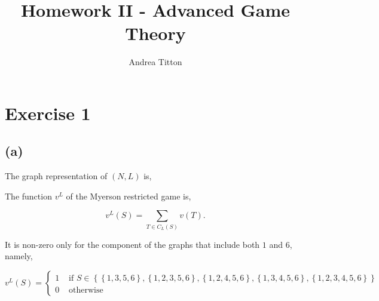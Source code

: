 \documentclass[american]{scrartcl}
\title{Homework II - Advanced Game Theory }
\author{Andrea Titton}
\newcommand{\set}[1]{\left\{#1\right\}}
\begin{document}

\maketitle

\section*{Exercise 1}

\subsection*{(a)}

The graph representation of $(N, L)$ is,

\vspace{1cm}
\begin{center}
\end{center}


The function $v^L$ of the Myerson restricted game is,

\begin{equation}
    v^L(S) = \sum_{T \in C_L(S)} v(T).
\end{equation}

It is non-zero only for the component of the graphs that include both $1$ and $6$, namely,

\begin{equation} \label{value_a}
    v^L(S) = \begin{cases}
        1 & \text{ if } S \in \set{\set{1, 3, 5, 6}, \set{1, 2, 3, 5, 6}, \set{1, 2, 4, 5, 6}, \set{1, 3, 4, 5, 6}, \set{1, 2, 3, 4, 5, 6}} \\
        0 & \text{ otherwise }
    \end{cases}
\end{equation}
\end{document}
